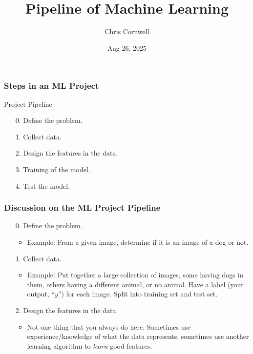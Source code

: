 \documentclass{beamer}
\author{Chris Cornwell}
\date{Aug 26, 2025}
\title{Pipeline of Machine Learning}
\newenvironment{codeblock}
    {\hfill\begin{beamerboxesrounded}[lower=codecol, width=0.8\textwidth]
    \medskip

    }
    { 
    \end{beamerboxesrounded}\hfill
    }
\theoremstyle{example}
\newcommand{\gnum}[1]{{\color{mygreen}#1.}}
\begin{document}
\begin{frame}
\titlepage
\end{frame}


\begin{frame}
\frametitle{Steps in an ML Project}

\begin{codeblock}

{\color{mygreen}Project Pipeline
    \begin{enumerate}
        \item[\gnum{0}] Define the problem.
        \item[\gnum{1}] Collect data.
        \item[\gnum{2}] Design the features in the data.
        \item[\gnum{3}] Training of the model.
        \item[\gnum{4}] Test the model.
    \end{enumerate}
}

\end{codeblock}

\end{frame}

\begin{frame}
\frametitle{Discussion on the ML Project Pipeline}
    \begin{enumerate}
        \item[\gnum{0}] Define the problem.
        \begin{itemize}
            \item Example: From a given image, determine if it is an image of a dog or not.
        \end{itemize}
        \pause
        \item[\gnum{1}] Collect data.
        \begin{itemize}
            \item Example: Put together a large collection of images, some having dogs in them, others having a different animal, or no animal. Have a label (your output, ``$y$'') for each image. Split into training set and test set.
        \end{itemize}
        \pause
        \item[\gnum{2}] Design the features in the data.
        \begin{itemize}
            \item Not one thing that you always do here. Sometimes use experience/knowledge of what the data represents, sometimes use another learning algorithm to \textit{learn} good features.
        \end{itemize}
    \end{enumerate}
\end{frame}
\end{document}
